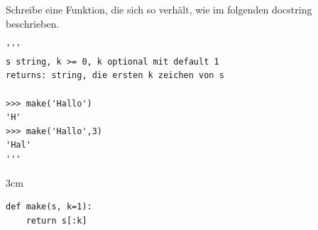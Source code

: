 
\question[2]
Schreibe eine Funktion, die sich so verhält, wie im folgenden docstring beschrieben.

 
\begin{lstlisting}
'''
s string, k >= 0, k optional mit default 1
returns: string, die ersten k zeichen von s
 
>>> make('Hallo')
'H'
>>> make('Hallo',3)
'Hal'
'''
\end{lstlisting}

\begin{solutionbox}{3cm}
\begin{lstlisting}
def make(s, k=1):
    return s[:k]
\end{lstlisting}
\end{solutionbox}
